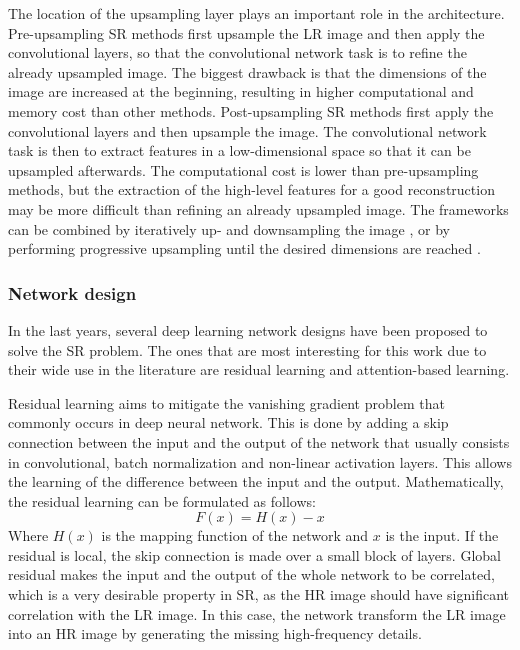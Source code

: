         The location of the upsampling layer plays an important role in the architecture. Pre-upsampling SR methods first upsample the LR image and then apply the convolutional layers, so that the convolutional network task is to refine the already upsampled image. The biggest drawback is that the dimensions of the image are increased at the beginning, resulting in higher computational and memory cost than other methods.
        Post-upsampling SR methods first apply the convolutional layers and then upsample the image. The convolutional network task is then to extract features in a low-dimensional space so that it can be upsampled afterwards. The computational cost is lower than pre-upsampling methods, but the extraction of the high-level features for a good reconstruction may be more difficult than refining an already upsampled image. 
        The frameworks can be combined by iteratively up- and downsampling the image \cite{timofte2015seven}, or by performing progressive upsampling until the desired dimensions are reached \cite{lai2017deep}.

        \subsubsection{Network design}

        In the last years, several deep learning network designs have been proposed to solve the SR problem.  The ones that are most interesting for this work due to their wide use in the literature are residual learning and attention-based learning. 
        
        Residual learning aims to mitigate the vanishing gradient problem that commonly occurs in deep neural network. This is done by adding a skip connection between the input and the output of the network that usually consists in convolutional, batch normalization and non-linear activation layers. This allows the learning of the difference between the input and the output. Mathematically, the residual learning can be formulated as follows:
        \begin{equation}
            F(x) = H(x) - x
            \label{eq:2-residual-learning}
        \end{equation}
        Where $H(x)$ is the mapping function of the network and $x$ is the input. If the residual is local, the skip connection is made over a small block of layers. Global residual makes the input and the output of the whole network to be correlated, which is a very desirable property in SR, as the HR image should have significant correlation with the LR image. In this case, the network transform the LR image into an HR image by generating the missing high-frequency details. 
        
